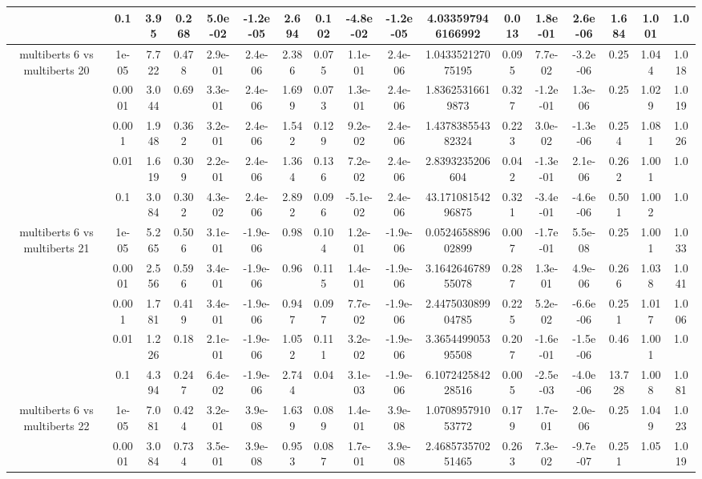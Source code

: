 \begin{tabular}{|c|c|c|c|c|c|c|c|c|c|c|c|c|c|c|c|c|}
 & 0.1 & 3.95 & 0.268 & 5.0e-02 & -1.2e-05 & 2.694 & 0.102 & -4.8e-02 & -1.2e-05 & 4.033597946166992 & 0.013 & 1.8e-01 & 2.6e-06 & 1.684 & 1.001 & 1.0 \\
\hline
\multirow{5}{*}{multiberts 6 vs multiberts 20} & 1e-05 & 7.722 & 0.478 & 2.9e-01 & 2.4e-06 & 2.386 & 0.075 & 1.1e-01 & 2.4e-06 & 1.043352127075195 & 0.095 & 7.7e-02 & -3.2e-06 & 0.25 & 1.044 & 1.018 \\
 & 0.0001 & 3.044 & 0.69 & 3.3e-01 & 2.4e-06 & 1.699 & 0.073 & 1.3e-01 & 2.4e-06 & 1.83625316619873 & 0.327 & -1.2e-01 & 1.3e-06 & 0.25 & 1.029 & 1.019 \\
 & 0.001 & 1.948 & 0.362 & 3.2e-01 & 2.4e-06 & 1.542 & 0.129 & 9.2e-02 & 2.4e-06 & 1.437838554382324 & 0.223 & 3.0e-02 & -1.3e-06 & 0.254 & 1.081 & 1.026 \\
 & 0.01 & 1.619 & 0.309 & 2.2e-01 & 2.4e-06 & 1.364 & 0.136 & 7.2e-02 & 2.4e-06 & 2.8393235206604 & 0.042 & -1.3e-01 & 2.1e-06 & 0.262 & 1.001 & 1.0 \\
 & 0.1 & 3.084 & 0.302 & 4.3e-02 & 2.4e-06 & 2.892 & 0.096 & -5.1e-02 & 2.4e-06 & 43.17108154296875 & 0.321 & -3.4e-01 & -4.6e-06 & 0.501 & 1.002 & 1.0 \\
\hline
\multirow{5}{*}{multiberts 6 vs multiberts 21} & 1e-05 & 5.265 & 0.506 & 3.1e-01 & -1.9e-06 & 0.98 & 0.104 & 1.2e-01 & -1.9e-06 & 0.052465889602899 & 0.007 & -1.7e-01 & 5.5e-08 & 0.25 & 1.001 & 1.033 \\
 & 0.0001 & 2.556 & 0.596 & 3.4e-01 & -1.9e-06 & 0.96 & 0.115 & 1.4e-01 & -1.9e-06 & 3.164264678955078 & 0.287 & 1.3e-01 & 4.9e-06 & 0.266 & 1.038 & 1.041 \\
 & 0.001 & 1.781 & 0.419 & 3.4e-01 & -1.9e-06 & 0.947 & 0.097 & 7.7e-02 & -1.9e-06 & 2.447503089904785 & 0.225 & 5.2e-02 & -6.6e-06 & 0.251 & 1.017 & 1.006 \\
 & 0.01 & 1.226 & 0.18 & 2.1e-01 & -1.9e-06 & 1.052 & 0.111 & 3.2e-02 & -1.9e-06 & 3.365449905395508 & 0.207 & -1.6e-01 & -1.5e-06 & 0.46 & 1.001 & 1.0 \\
 & 0.1 & 4.394 & 0.247 & 6.4e-02 & -1.9e-06 & 2.744 & 0.04 & 3.1e-03 & -1.9e-06 & 6.107242584228516 & 0.005 & -2.5e-03 & -4.0e-06 & 13.728 & 1.008 & 1.081 \\
\hline
\multirow{5}{*}{multiberts 6 vs multiberts 22} & 1e-05 & 7.081 & 0.424 & 3.2e-01 & 3.9e-08 & 1.639 & 0.089 & 1.4e-01 & 3.9e-08 & 1.070895791053772 & 0.179 & 1.7e-01 & 2.0e-06 & 0.25 & 1.049 & 1.023 \\
 & 0.0001 & 3.084 & 0.734 & 3.5e-01 & 3.9e-08 & 0.953 & 0.087 & 1.7e-01 & 3.9e-08 & 2.468573570251465 & 0.263 & 7.3e-02 & -9.7e-07 & 0.251 & 1.05 & 1.019 \\

\end{tabular}
